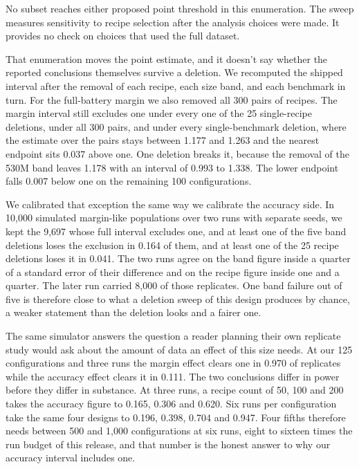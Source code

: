 No subset reaches either proposed point threshold in this enumeration. The sweep measures sensitivity to recipe selection after the analysis choices were made. It provides no check on choices that used the full dataset.

That enumeration moves the point estimate, and it doesn't say whether the reported conclusions themselves survive a deletion. We recomputed the shipped interval after the removal of each recipe, each size band, and each benchmark in turn. For the full-battery margin we also removed all 300 pairs of recipes. The margin interval still excludes one under every one of the 25 single-recipe deletions, under all 300 pairs, and under every single-benchmark deletion, where the estimate over the pairs stays between 1.177 and 1.263 and the nearest endpoint sits 0.037 above one. One deletion breaks it, because the removal of the 530M band leaves 1.178 with an interval of 0.993 to 1.338. The lower endpoint falls 0.007 below one on the remaining 100 configurations.

We calibrated that exception the same way we calibrate the accuracy side. In 10,000 simulated margin-like populations over two runs with separate seeds, we kept the 9,697 whose full interval excludes one, and at least one of the five band deletions loses the exclusion in 0.164 of them, and at least one of the 25 recipe deletions loses it in 0.041. The two runs agree on the band figure inside a quarter of a standard error of their difference and on the recipe figure inside one and a quarter. The later run carried 8,000 of those replicates. One band failure out of five is therefore close to what a deletion sweep of this design produces by chance, a weaker statement than the deletion looks and a fairer one.

The same simulator answers the question a reader planning their own replicate study would ask about the amount of data an effect of this size needs. At our 125 configurations and three runs the margin effect clears one in 0.970 of replicates while the accuracy effect clears it in 0.111. The two conclusions differ in power before they differ in substance. At three runs, a recipe count of 50, 100 and 200 takes the accuracy figure to 0.165, 0.306 and 0.620. Six runs per configuration take the same four designs to 0.196, 0.398, 0.704 and 0.947. Four fifths therefore needs between 500 and 1,000 configurations at six runs, eight to sixteen times the run budget of this release, and that number is the honest answer to why our accuracy interval includes one.

